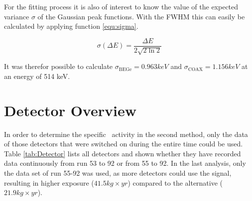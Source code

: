 For the fitting process it is also of interest to know the value of the expected variance $\sigma$ of the Gaussian peak functions.
With the FWHM this can easily be calculated by applying function \ref{equ:sigma}.

\begin{equation}
\sigma (\Delta E) = \frac{\Delta E}{2\sqrt{2\ln2}}
\label{equ:sigma}
\end{equation}

It was therefor possible to calculate $\sigma_{\mathrm{BEGe}} = 0.963 \unit{keV}$ and $\sigma_{\mathrm{COAX}} = 1.156 \unit{keV}$ at an energy of 514 keV.


\chapter{Detector Overview}

In order to determine the specific \Kr\ activity in the second method, only the data of those detectors that were switched on during the entire time could be used.
Table \ref{tab:Detector} lists all detectors and shown whether they have recorded data continuously from run 53 to 92 or from 55 to 92.
In the last analysis, only the data set of run 55-92 was used, as more detectors could use the signal, resulting in higher exposure ($41.5 \unit{kg}\times\unit{yr}$) compared to the alternative ($21.9 \unit{kg}\times\unit{yr}$).

